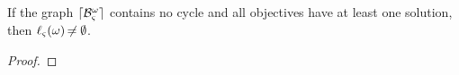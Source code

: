 \def\muconcr{\ell}
\def\uconcr{\muconcr_\ctx}

\begin{theorem}\label{th:approxinf}
If the graph $\lceil \mathcal{B}_\varsigma^\omega\rceil$ contains no cycle and all objectives have at least one solution, then $\uconcr(\w) \neq \emptyset$.
\end{theorem}

\begin{proof}

\begin{comment}
We note $max\ctx = \ctx \Cap \allprocs(\cwB)$ the context supported by $\cwB$.
As there is no cycle in $\cwB$, we show by induction that $\forall s\in L, s\subseteq max\ctx$, 
for all objective $P$ in $\cwB$ so that $\PHtarget(P) \in s$,
$\exists \delta \in \muconcr_s(P)$.%

\begin{itemize}
  \item If $(P, \emptyset) \in \Bsol$, either $\PHtarget(P) = \PHbounce(P)$ and $\delta = \emptyseq$,
    or $\forall \zeta \in \BS(P), \zeta \in \Sce \wedge \PHsort(\zeta) = \{ \PHsort(P) \}$ and $\delta$ is given by \pref{th:autohits}.


\end{comment}
\end{proof}
